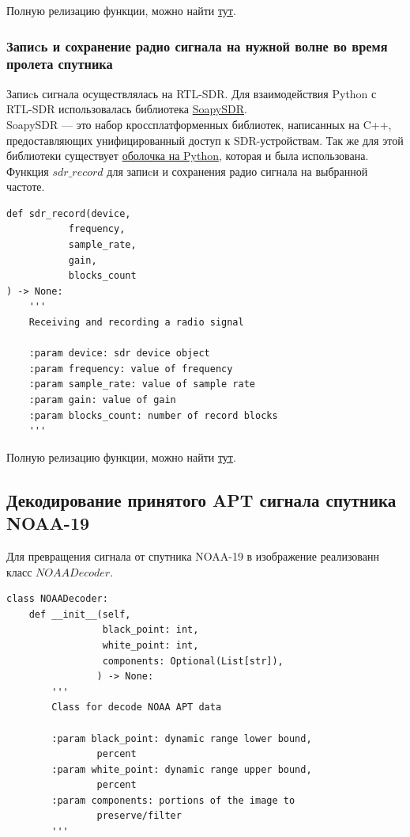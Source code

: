 \documentclass[a4paper, 14pt, titlepage, fleqn]{extarticle}
\begin{document}
	\noindent Полную релизацию функции, можно найти \href{...}{тут}. \\
	
	\pagebreak
	\subsubsection*{Запиcь и сохранение радио сигнала на нужной волне во время пролета спутника}
	
	 \noindent Запиcь сигнала осуществлялась на RTL-SDR. Для взаимодействия Python с RTL-SDR использовалась библиотека \href{https://github.com/pothosware/SoapySDR/wiki}{SoapySDR}. \\ 
	
	\noindent SoapySDR — это набор кроссплатформенных библиотек, написанных на C++, предоставляющих унифицированный доступ к SDR-устройствам. Так же для этой библиотеки существует \href{https://github.com/pothosware/SoapySDR/wiki/PythonSupport}{оболочка на Python}, которая и была использована. \\
	
	\noindent Функция $sdr\_record$ для запиcи и сохранения радио сигнала на выбранной частоте.
	
	\begin{verbatim}
def sdr_record(device,
	       frequency,
	       sample_rate,
	       gain,
	       blocks_count
) -> None:
    '''
    Receiving and recording a radio signal

    :param device: sdr device object
    :param frequency: value of frequency
    :param sample_rate: value of sample rate
    :param gain: value of gain
    :param blocks_count: number of record blocks 
    '''
	\end{verbatim}
	
	\noindent Полную релизацию функции, можно найти \href{...}{тут}. \\
	
	\pagebreak
	\subsection*{Декодирование принятого APT сигнала спутника NOAA-19}
	
	Для превращения сигнала от спутника NOAA-19 в изображение реализованн класс $NOAADecoder$.
	
	\begin{verbatim}
class NOAADecoder:
    def __init__(self,
                 black_point: int,
                 white_point: int,
                 components: Optional(List[str]),
                ) -> None:
        '''
        Class for decode NOAA APT data

        :param black_point: dynamic range lower bound, 
        		percent
        :param white_point: dynamic range upper bound, 
        		percent
        :param components: portions of the image to 
        		preserve/filter
        '''
	\end{verbatim}
	
\end{document}

